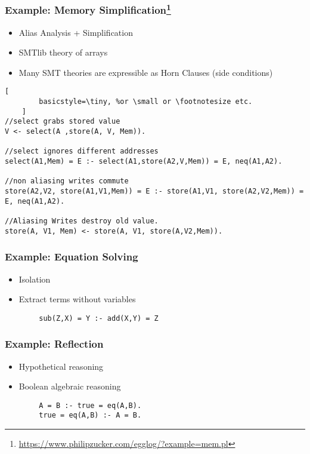 \documentclass{beamer}
\begin{document}
\begin{frame}[fragile]
    \frametitle{Example: Memory Simplification\footnote{\url{https://www.philipzucker.com/egglog/?example=mem.pl}}}
    \begin{itemize}
        \item Alias Analysis + Simplification
        \item SMTlib theory of arrays %
        \item Many SMT theories are expressible as Horn Clauses (side conditions)
    \end{itemize}
    \begin{lstlisting}[
        basicstyle=\tiny, %or \small or \footnotesize etc.
    ]
//select grabs stored value
V <- select(A ,store(A, V, Mem)).

//select ignores different addresses
select(A1,Mem) = E :- select(A1,store(A2,V,Mem)) = E, neq(A1,A2).

//non aliasing writes commute
store(A2,V2, store(A1,V1,Mem)) = E :- store(A1,V1, store(A2,V2,Mem)) = E, neq(A1,A2).

//Aliasing Writes destroy old value.
store(A, V1, Mem) <- store(A, V1, store(A,V2,Mem)).
\end{lstlisting}
\end{frame}

\begin{frame}[fragile]
    \frametitle{Example: Equation Solving}
    \begin{itemize}
        \item Isolation
        \item Extract terms without variables
    \end{itemize}
    \begin{lstlisting}
        sub(Z,X) = Y :- add(X,Y) = Z
    \end{lstlisting}
\end{frame}

\begin{frame}[fragile]
    \frametitle{Example: Reflection}
    \begin{itemize}
        \item Hypothetical reasoning
        \item Boolean algebraic reasoning
    \end{itemize}
    \begin{lstlisting}
        A = B :- true = eq(A,B).
        true = eq(A,B) :- A = B.    
    \end{lstlisting}
\end{frame}
\end{document}
